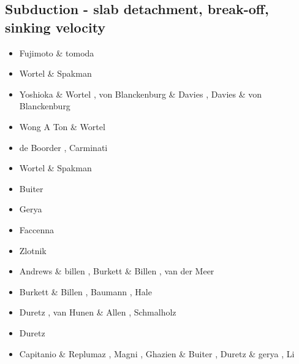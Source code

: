 \subsection{Subduction - slab detachment, break-off, sinking velocity}

\begin{scriptsize}
\begin{itemize}
\item[\nineteeneightyfive] Fujimoto \& tomoda \cite{futo85}
\item[\nineteenninetytwo] Wortel \& Spakman \cite{wosp92}
\item[\nineteenninetyfive] Yoshioka \& Wortel \cite{yowo95}, von Blanckenburg \& Davies \cite{voda95},
                           Davies \& von Blanckenburg \cite{davo95}
\item[\nineteenninetyseven] Wong A Ton \& Wortel \cite{wowo97}
\item[\nineteenninetyeight] de Boorder \etal \cite{desw98}, Carminati \etal \cite{caws98}
\item[\twothousand] Wortel \& Spakman \cite{wosp00}
\item[\twothousandtwo] Buiter \etal \cite{bugw02}
\item[\twothousandfour] Gerya \etal \cite{geym04}
\item[\twothousandsix] Faccenna \etal \cite{fabm06}
\item[\twothousandeight] Zlotnik \etal \cite{zlfd08}
\item[\twothousandnine] Andrews \& billen \cite{anbi09}, Burkett \& Billen \cite{bubi09},
                        van der Meer \etal \cite{vasv09}
\item[\twothousandten] Burkett \& Billen \cite{bubi10}, Baumann \etal \cite{bagc10},
                       Hale \etal \cite{hagr10}
\item[\twothousandeleven] Duretz \etal \cite{dugm11}, van Hunen \& Allen \cite{vaal11},
                          Schmalholz \cite{schm11}
\item[\twothousandtwelve] Duretz \etal \cite{dugk12,dusg12}
\item[\twothousandthirteen] Capitanio \& Replumaz \cite{care13}, Magni \etal \cite{mafv13},
                            Ghazien \& Buiter \cite{ghbu13}, Duretz \& gerya \cite{duge13}, 
                            Li \etal \cite{lixg13}

\end{itemize}
\end{scriptsize}
